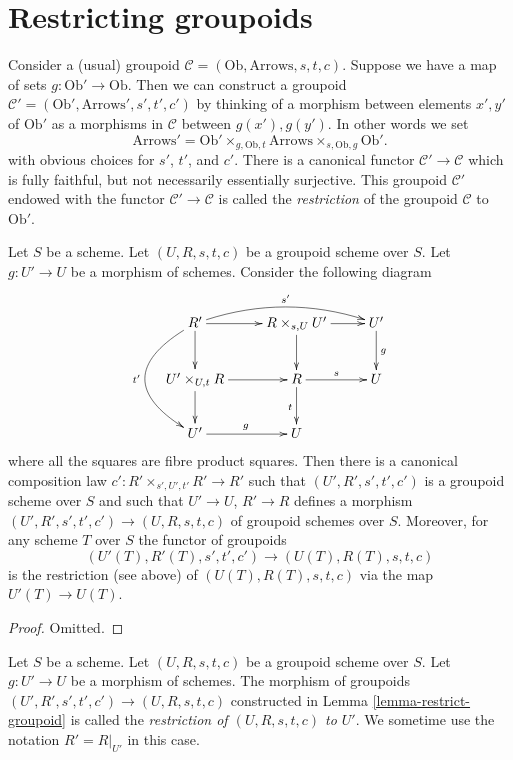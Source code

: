 \section{Restricting groupoids}
\label{section-restrict-groupoid}

\noindent
Consider a (usual) groupoid
$\mathcal{C} = (\text{Ob}, \text{Arrows}, s, t, c)$.
Suppose we have a map of sets $g : \text{Ob}' \to \text{Ob}$.
Then we can construct a groupoid
$\mathcal{C}' = (\text{Ob}', \text{Arrows}', s', t', c')$
by thinking of a morphism between elements $x', y'$ of $\text{Ob}'$
as a morphisms in $\mathcal{C}$ between $g(x'), g(y')$.
In other words we set
$$
\text{Arrows}' =
\text{Ob}'
\times_{g, \text{Ob}, t}
\text{Arrows}
\times_{s, \text{Ob}, g}
\text{Ob}'.
$$
with obvious choices for $s'$, $t'$, and $c'$. There is a canonical
functor $\mathcal{C}' \to \mathcal{C}$ which is fully faithful,
but not necessarily essentially surjective. This groupoid $\mathcal{C}'$
endowed with the functor $\mathcal{C}' \to \mathcal{C}$
is called the {\it restriction} of the groupoid
$\mathcal{C}$ to $\text{Ob}'$.

\begin{lemma}
\label{lemma-restrict-groupoid}
Let $S$ be a scheme.
Let $(U, R, s, t, c)$ be a groupoid scheme over $S$.
Let $g : U' \to U$ be a morphism of schemes.
Consider the following diagram
$$
\xymatrix{
R' \ar[d] \ar[r] \ar@/_3pc/[dd]_{t'} \ar@/^1pc/[rr]^{s'}&
R \times_{s, U} U' \ar[r] \ar[d] &
U' \ar[d]^g \\
U' \times_{U, t} R \ar[d] \ar[r] &
R \ar[r]^s \ar[d]_t &
U \\
U' \ar[r]^g &
U
}
$$
where all the squares are fibre product squares. Then there is a
canonical composition law $c' : R' \times_{s', U', t'} R' \to R'$
such that $(U', R', s', t', c')$ is a groupoid scheme over
$S$ and such that $U' \to U$, $R' \to R$ defines a morphism
$(U', R', s', t', c') \to (U, R, s, t, c)$ of groupoid schemes over $S$.
Moreover, for any scheme $T$ over $S$ the functor of groupoids
$$
(U'(T), R'(T), s', t', c') \to (U(T), R(T), s, t, c)
$$
is the restriction (see above) of $(U(T), R(T), s, t, c)$ via the map
$U'(T) \to U(T)$.
\end{lemma}

\begin{proof}
Omitted.
\end{proof}

\begin{definition}
\label{definition-restrict-groupoid}
Let $S$ be a scheme.
Let $(U, R, s, t, c)$ be a groupoid scheme over $S$.
Let $g : U' \to U$ be a morphism of schemes.
The morphism of groupoids
$(U', R', s', t', c') \to (U, R, s, t, c)$
constructed in Lemma \ref{lemma-restrict-groupoid} is called
the {\it restriction of $(U, R, s, t, c)$ to $U'$}.
We sometime use the notation $R' = R|_{U'}$ in this case.
\end{definition}

